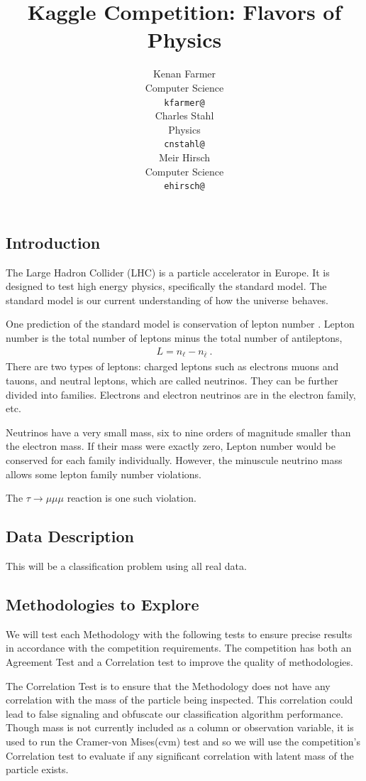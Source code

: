 \documentclass{article} %
\title{Kaggle Competition: Flavors of Physics}
\author{
Kenan Farmer\\
Computer Science\\
\texttt{kfarmer@} \\
\And
Charles Stahl \\
Physics \\
\texttt{cnstahl@} \\
\And
Meir Hirsch\\
Computer Science \\
\texttt{ehirsch@} \\
}
\begin{document}
\maketitle

\subsection*{Introduction}

The Large Hadron Collider (LHC) is a particle accelerator in Europe. It is designed to test high energy physics, specifically the standard model. The standard model is our current understanding of how the universe behaves. 

One prediction of the standard model is conservation of lepton number \cite{griff87}. Lepton number is the total number of leptons minus the total number of antileptons,
\begin{align}
L=n_{\ell }-n_{\overline {\ell }}~.
\end{align}
There are two types of leptons: charged leptons such as electrons muons and tauons, and neutral leptons, which are called neutrinos. They can be further divided into families. Electrons and electron neutrinos are in the electron family, etc.

Neutrinos have a very small mass, six to nine orders of magnitude smaller than the electron mass. If their mass were exactly zero, Lepton number would be conserved for each family individually. However, the minuscule neutrino mass allows some lepton family number violations. 

The $\tau\to\mu\mu\mu$ reaction is one such violation. 

\subsection*{Data Description}

This will be a classification problem using all real data.

\subsection*{Methodologies to Explore}

We will test each Methodology with the following tests to ensure precise results in accordance with the competition requirements. The competition has both an Agreement Test and a Correlation test to improve the quality of methodologies.

The Correlation Test is to ensure that the Methodology does not have any correlation with the mass of the particle being inspected. This correlation could lead to false signaling and obfuscate our classification algorithm performance. Though mass is not currently included as a column or observation variable, it is used to run the Cramer-von Mises(cvm) test and so we will use the competition's Correlation test to evaluate if any significant correlation with latent mass of the particle exists.
\end{document}
